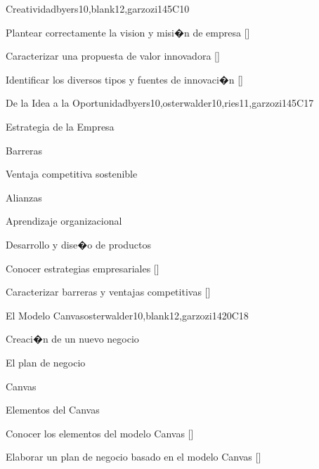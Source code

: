 \begin{syllabus}
\begin{unit}{}{Creatividad}{byers10,blank12,garzozi14}{5}{C10}
    \begin{learningoutcomes} 
      \item Plantear correctamente la vision y misi�n de empresa  [\Usage]
	  \item Caracterizar una propuesta de valor innovadora  [\Assessment]
      \item Identificar los diversos tipos y fuentes de innovaci�n  [\Familiarity]
   \end{learningoutcomes} 
\end{unit}

\begin{unit}{}{De la Idea a la Oportunidad}{byers10,osterwalder10,ries11,garzozi14}{5}{C17}
\begin{topics}
      \item Estrategia de la Empresa
      \item Barreras 
      \item Ventaja competitiva sostenible
      \item Alianzas
      \item Aprendizaje organizacional
      \item Desarrollo y dise�o de productos
   \end{topics}

  \begin{learningoutcomes} 
      \item Conocer estrategias empresariales  [\Familiarity]
      \item Caracterizar barreras y ventajas competitivas   [\Familiarity]
       
    \end{learningoutcomes} 
\end{unit}

\begin{unit}{}{El Modelo Canvas}{osterwalder10,blank12,garzozi14}{20}{C18}
	\begin{topics}
      \item Creaci�n de un nuevo negocio
      \item El plan de negocio 
      \item Canvas
      \item Elementos del Canvas
   \end{topics}

  \begin{learningoutcomes} 
      \item Conocer los elementos del modelo Canvas  [\Usage]
      \item Elaborar un plan de negocio basado en el modelo Canvas  [\Usage]
    \end{learningoutcomes} 
\end{unit}


\end{syllabus}
